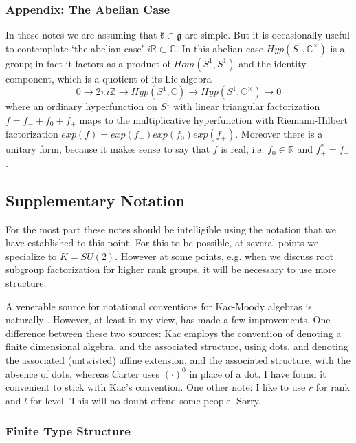 \documentclass{amsart}
\theoremstyle{conjecture}
\theoremstyle{definition}
\theoremstyle{question}
\theoremstyle{questions}
\theoremstyle{remark}
\theoremstyle{remarks}
\theoremstyle{example}
\numberwithin{equation}{section}
\begin{document}
\subsubsection{Appendix: The Abelian Case}\label{abeliancase}

In these notes we are assuming that $\mathfrak k \subset \mathfrak g$ are simple. But it is occasionally useful to contemplate `the abelian case' $i\mathbb R \subset \mathbb C$. In this abelian case $Hyp(S^1, \mathbb C^{\times})$
is a group; in fact it factors as a product of $Hom(S^1,S^1)$ and the identity component, which is a quotient of its Lie algebra
$$0 \to 2\pi i\mathbb Z \to Hyp(S^1,\mathbb C)\to Hyp(S^1,\mathbb C^{\times})\to 0 $$
where an ordinary hyperfunction on $S^1$ with linear triangular factorization $f=f_-+f_0+f_+$ maps to the multiplicative hyperfunction with Riemann-Hilbert factorization $exp(f)=exp(f_-)exp(f_0)exp(f_+)$. Moreover there is a unitary form, because it makes sense to say that $f$ is real, i.e. $f_0\in\mathbb R$ and $f_+^*=f_-$.


\subsection{Supplementary Notation}\label{supplement}

For the most part these notes should be intelligible using the notation
that we have established to this point. For this to be possible, at several points
we specialize to $K=SU(2)$. However at some points, e.g. when we discuss
root subgroup factorization for higher rank groups, it will be necessary to
use more structure.

A venerable source for notational conventions for Kac-Moody algebras is naturally \cite{Kac}.
However, at least in my view, \cite{Carter} has made a few improvements. One difference between
 these two sources: Kac employs the convention
of denoting a finite dimensional algebra, and the associated structure, using dots,
and denoting the associated (untwisted) affine extension, and the associated structure, with the absence of dots,
whereas Carter uses $(\cdot)^0$ in place of a dot. I have found it convenient to stick with Kac's convention.
One other note: I like to use $r$ for rank and $l$ for level. This will no doubt offend some people. Sorry.

\subsubsection{Finite Type Structure}
\end{document}
